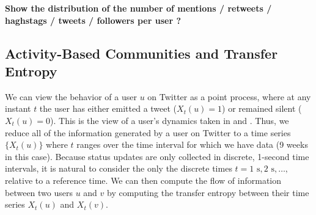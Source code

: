 \textbf{Show the distribution of the number of mentions / retweets / haghstags / tweets / followers per user ?}

\subsection{Activity-Based Communities and Transfer Entropy}

\label{method-activity}

We can view the behavior of a user $u$ on Twitter as a point process, where at any instant $t$ the user has either emitted a tweet ($X_{t}(u) = 1$) or remained silent ($X_{t}(u) = 0$). This is the view of a user's dynamics taken in \cite{ver2012information} and \cite{darmon2013understanding}. Thus, we reduce all of the information generated by a user on Twitter to a time series $\{ X_{t}(u)\}$ where $t$ ranges over the time interval for which we have data (9 weeks in this case). Because status updates are only collected in discrete, 1-second time intervals, it is natural to consider the only the discrete times $t = 1 \text{ s}, 2 \text{ s}, \ldots, $ relative to a reference time. We can then compute the flow of information between two users $u$ and $v$ by computing the transfer entropy between their time series $X_{t}(u)$ and $X_{t}(v).$

